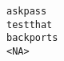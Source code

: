 \documentclass[
  letterpaper,
  DIV=11,
  numbers=noendperiod]{scrreprt}
\begin{document}
\begin{verbatim}
askpass                                                                                                                                                                                                                                                                                                                                                                                                                                                                                                                                                                                                                                                                                                                                                                                                                                                                                                                                                                                                                                                                                                                                                                                                                                                                                              testthat
backports                                                                                                                                                                                                                                                                                                                                                                                                                                                                                                                                                                                                                                                                                                                                                                                                                                                                                                                                                                                                                                                                                                                                                                                                                                                                                                <NA>

\end{verbatim}
\end{document}
